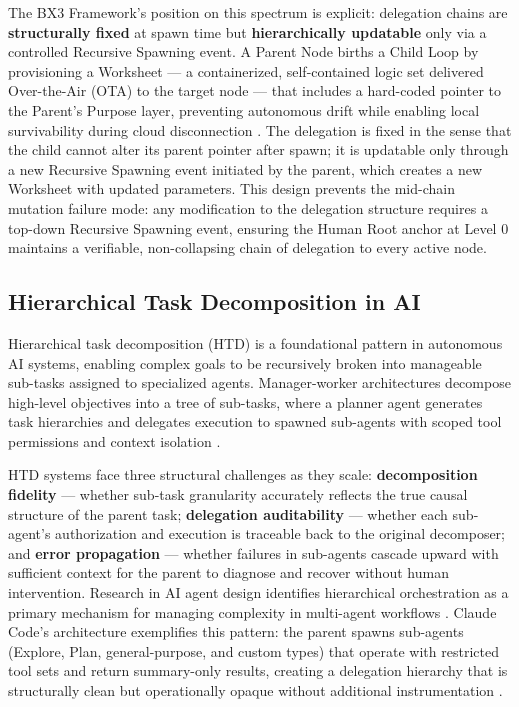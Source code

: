 The BX3 Framework's position on this spectrum is explicit: delegation chains are \textbf{structurally fixed} at spawn time but \textbf{hierarchically updatable} only via a controlled Recursive Spawning event. A Parent Node births a Child Loop by provisioning a Worksheet — a containerized, self-contained logic set delivered Over-the-Air (OTA) to the target node — that includes a hard-coded pointer to the Parent's Purpose layer, preventing autonomous drift while enabling local survivability during cloud disconnection \cite{bx3_universal_spec_2026}. The delegation is fixed in the sense that the child cannot alter its parent pointer after spawn; it is updatable only through a new Recursive Spawning event initiated by the parent, which creates a new Worksheet with updated parameters. This design prevents the mid-chain mutation failure mode: any modification to the delegation structure requires a top-down Recursive Spawning event, ensuring the Human Root anchor at Level 0 maintains a verifiable, non-collapsing chain of delegation to every active node.

\subsection{Hierarchical Task Decomposition in AI}
\label{sec:task-decomp}

Hierarchical task decomposition (HTD) is a foundational pattern in autonomous AI systems, enabling complex goals to be recursively broken into manageable sub-tasks assigned to specialized agents. Manager-worker architectures decompose high-level objectives into a tree of sub-tasks, where a planner agent generates task hierarchies and delegates execution to spawned sub-agents with scoped tool permissions and context isolation \cite{lumenova_govern_2025, sap_agent_arch_2025}.

HTD systems face three structural challenges as they scale: \textbf{decomposition fidelity} — whether sub-task granularity accurately reflects the true causal structure of the parent task; \textbf{delegation auditability} — whether each sub-agent's authorization and execution is traceable back to the original decomposer; and \textbf{error propagation} — whether failures in sub-agents cascade upward with sufficient context for the parent to diagnose and recover without human intervention. Research in AI agent design identifies hierarchical orchestration as a primary mechanism for managing complexity in multi-agent workflows \cite{linkedin_ai_agents_2025, futran_modelops_2025}. Claude Code's architecture exemplifies this pattern: the parent spawns sub-agents (Explore, Plan, general-purpose, and custom types) that operate with restricted tool sets and return summary-only results, creating a delegation hierarchy that is structurally clean but operationally opaque without additional instrumentation \cite{claude_code_design_2026}.

